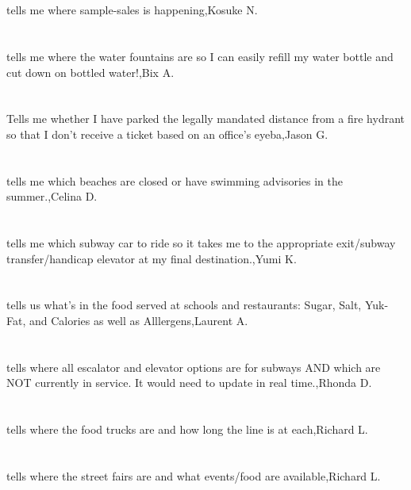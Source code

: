 \section{}tells me where sample-sales is happening,Kosuke N.
\section{}tells me where the water fountains are so I can easily refill my water bottle and cut down on bottled water!,Bix A.
\section{}Tells me whether I have parked the legally mandated distance from a fire hydrant so that I don't receive a ticket based on an office's eyeba,Jason G.
\section{}tells me which beaches are closed or have swimming advisories in the summer.,Celina D.
\section{}tells me which subway car to ride so it takes me to the appropriate exit/subway transfer/handicap elevator at my final destination.,Yumi K.
\section{}tells us what's in the food served at schools and restaurants: Sugar, Salt, Yuk-Fat, and Calories as well as Alllergens,Laurent A.
\section{}tells where all escalator and elevator options are for subways AND which are NOT currently in service. It would need to update in real time.,Rhonda D.
\section{}tells where the food trucks are and how long the line is at each,Richard L.
\section{}tells where the street fairs are and what events/food are available,Richard L.
